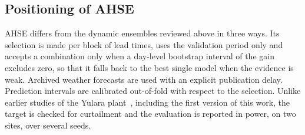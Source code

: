 \subsection*{Positioning of AHSE}
\label{subsec:rw_positioning}

AHSE differs from the dynamic ensembles reviewed above in three ways.
Its selection is made per block of lead times, uses the validation
period only and accepts a combination only when a day-level bootstrap
interval of the gain excludes zero, so that it falls back to the best
single model when the evidence is weak. Archived weather forecasts are
used with an explicit publication delay. Prediction intervals are
calibrated out-of-fold with respect to the selection. Unlike earlier
studies of the Yulara plant~\cite{cisse2026optimized}, including the
first version of this work, the target is checked for curtailment and
the evaluation is reported in power, on two sites, over several seeds.


